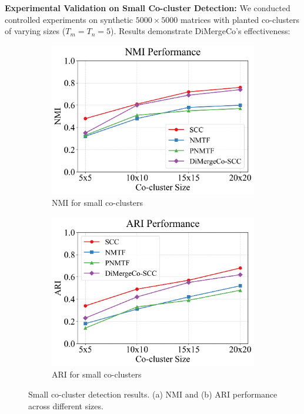 \documentclass{ar2rc}
\begin{document}
\textbf{Experimental Validation on Small Co-cluster Detection:} We conducted controlled experiments on synthetic $5000 \times 5000$ matrices with planted co-clusters of varying sizes ($T_m = T_n = 5$). Results demonstrate DiMergeCo's effectiveness:

\begin{figure}[t]
  \centering
  \begin{subfigure}[b]{0.48\textwidth}
      \centering
      \includegraphics[width=\linewidth]{images/nmi_small.png}
      \caption{NMI for small co-clusters}
      \label{fig:nmi_small}
  \end{subfigure}
  \hfill
  \begin{subfigure}[b]{0.48\textwidth}
      \centering
      \includegraphics[width=\linewidth]{images/ari_small.png}
      \caption{ARI for small co-clusters}
      \label{fig:ari_small}
  \end{subfigure}
  \caption{Small co-cluster detection results. (a) NMI and (b) ARI performance across different sizes.}
  \label{fig:small-co-cluster-detection}
\end{figure}
\end{document}
